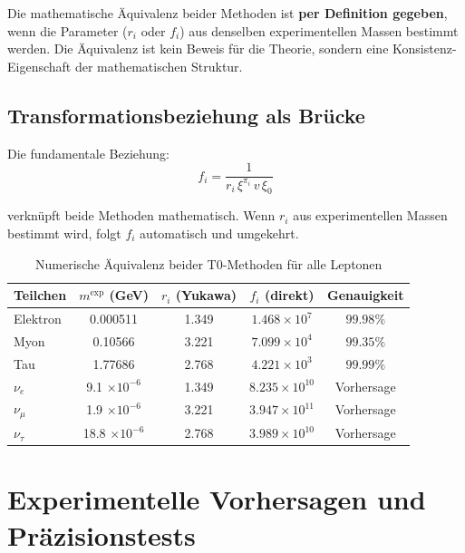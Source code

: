 	\begin{keypoint}
		Die mathematische Äquivalenz beider Methoden ist \textbf{per Definition gegeben}, wenn die Parameter ($r_i$ oder $f_i$) aus denselben experimentellen Massen bestimmt werden. Die Äquivalenz ist kein Beweis für die Theorie, sondern eine Konsistenz-Eigenschaft der mathematischen Struktur.
	\end{keypoint}
	
	\subsection{Transformationsbeziehung als Brücke}
	\label{subsec:transformationsbeziehung}
	
	Die fundamentale Beziehung:
	\begin{equation}
		f_i = \frac{1}{r_i \, \xi^{\pi_i} \, v \, \xi_0}
		\label{eq:transformation_bridge}
	\end{equation}
	
	verknüpft beide Methoden mathematisch. Wenn $r_i$ aus experimentellen Massen bestimmt wird, folgt $f_i$ automatisch und umgekehrt.
	
	\begin{table}[H]
		\centering
		\begin{tabular}{lcccc}
			\toprule
			\textbf{Teilchen} & \textbf{$m^{\text{exp}}$ (GeV)} & \textbf{$r_i$ (Yukawa)} & \textbf{$f_i$ (direkt)} & \textbf{Genauigkeit} \\
			\midrule
			Elektron & 0.000511 & 1.349 & $1.468 \times 10^{7}$ & $99.98\%$ \\
			Myon & 0.10566 & 3.221 & $7.099 \times 10^{4}$ & $99.35\%$ \\
			Tau & 1.77686 & 2.768 & $4.221 \times 10^{3}$ & $99.99\%$ \\
			\midrule
			$\nu_e$ & 9.1 $\times 10^{-6}$ & 1.349 & $8.235 \times 10^{10}$ & Vorhersage \\
			$\nu_\mu$ & 1.9 $\times 10^{-6}$ & 3.221 & $3.947 \times 10^{11}$ & Vorhersage \\
			$\nu_\tau$ & 18.8 $\times 10^{-6}$ & 2.768 & $3.989 \times 10^{10}$ & Vorhersage \\
			\bottomrule
		\end{tabular}
		\caption{Numerische Äquivalenz beider T0-Methoden für alle Leptonen}
		\label{tab:numerische_aequivalenz_komplett}
	\end{table}
	
	\section{Experimentelle Vorhersagen und Präzisionstests}
	\label{sec:experimentelle_vorhersagen}
	
